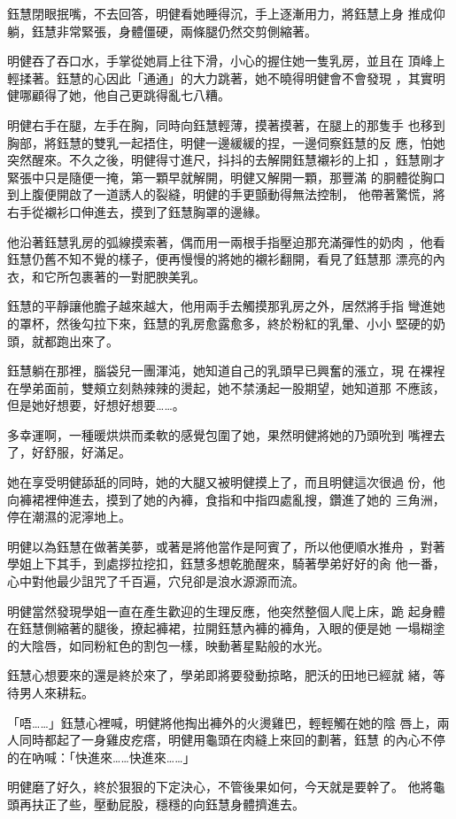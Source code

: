 鈺慧閉眼抿嘴，不去回答，明健看她睡得沉，手上逐漸用力，將鈺慧上身
推成仰躺，鈺慧非常緊張，身體僵硬，兩條腿仍然交剪側縮著。

明健吞了吞口水，手掌從她肩上往下滑，小心的握住她一隻乳房，並且在
頂峰上輕揉著。鈺慧的心因此「通通」的大力跳著，她不曉得明健會不會發現
，其實明健哪顧得了她，他自己更跳得亂七八糟。

明健右手在腿，左手在胸，同時向鈺慧輕薄，摸著摸著，在腿上的那隻手
也移到胸部，將鈺慧的雙乳一起捂住，明健一邊緩緩的捏，一邊伺察鈺慧的反
應，怕她突然醒來。不久之後，明健得寸進尺，抖抖的去解開鈺慧襯衫的上扣
，鈺慧剛才緊張中只是隨便一掩，第一顆早就解開，明健又解開一顆，那豐滿
的胴體從胸口到上腹便開啟了一道誘人的裂縫，明健的手更顫動得無法控制，
他帶著驚慌，將右手從襯衫口伸進去，摸到了鈺慧胸罩的邊緣。

他沿著鈺慧乳房的弧線摸索著，偶而用一兩根手指壓迫那充滿彈性的奶肉
，他看鈺慧仍舊不知不覺的樣子，便再慢慢的將她的襯衫翻開，看見了鈺慧那
漂亮的內衣，和它所包裹著的一對肥腴美乳。

鈺慧的平靜讓他膽子越來越大，他用兩手去觸摸那乳房之外，居然將手指
彎進她的罩杯，然後勾拉下來，鈺慧的乳房愈露愈多，終於粉紅的乳暈、小小
堅硬的奶頭，就都跑出來了。

鈺慧躺在那裡，腦袋兒一團渾沌，她知道自己的乳頭早已興奮的漲立，現
在裸裎在學弟面前，雙頰立刻熱辣辣的燙起，她不禁湧起一股期望，她知道那
不應該，但是她好想要，好想好想要……。

多幸運啊，一種暖烘烘而柔軟的感覺包圍了她，果然明健將她的乃頭吮到
嘴裡去了，好舒服，好滿足。

她在享受明健舔舐的同時，她的大腿又被明健摸上了，而且明健這次很過
份，他向褲裙裡伸進去，摸到了她的內褲，食指和中指四處亂搜，鑽進了她的
三角洲，停在潮濕的泥濘地上。

明健以為鈺慧在做著美夢，或著是將他當作是阿賓了，所以他便順水推舟
，對著學姐上下其手，到處拶拉挖扣，鈺慧多想乾脆醒來，騎著學弟好好的肏
他一番，心中對他最少詛咒了千百遍，穴兒卻是浪水源源而流。

明健當然發現學姐一直在產生歡迎的生理反應，他突然整個人爬上床，跪
起身體在鈺慧側縮著的腿後，撩起褲裙，拉開鈺慧內褲的褲角，入眼的便是她
一塌糊塗的大陰唇，如同粉紅色的割包一樣，映動著星點般的水光。

鈺慧心想要來的還是終於來了，學弟即將要發動掠略，肥沃的田地已經就
緒，等待男人來耕耘。

「唔……」鈺慧心裡喊，明健將他掏出褲外的火燙雞巴，輕輕觸在她的陰
唇上，兩人同時都起了一身雞皮疙瘩，明健用龜頭在肉縫上來回的劃著，鈺慧
的內心不停的在吶喊：「快進來……快進來……」

明健磨了好久，終於狠狠的下定決心，不管後果如何，今天就是要幹了。
他將龜頭再扶正了些，壓動屁股，穩穩的向鈺慧身體擠進去。

